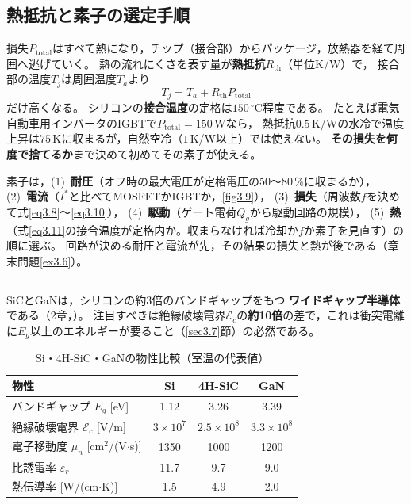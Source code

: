 \subsection{熱抵抗と素子の選定手順}

損失$P_{\mathrm{total}}$はすべて熱になり，チップ（接合部）からパッケージ，放熱器を経て周囲へ逃げていく。
熱の流れにくさを表す量が\textbf{熱抵抗}$R_{\mathrm{th}}$（単位K/W）で，
接合部の温度$T_j$は周囲温度$T_a$より
\begin{equation}
T_j = T_a + R_{\mathrm{th}}P_{\mathrm{total}}
\label{eq3.11}
\end{equation}
だけ高くなる。
シリコンの\textbf{接合温度}の定格は$150\,^{\circ}$C程度である。
たとえば電気自動車用インバータのIGBTで$P_{\mathrm{total}} = 150$\,Wなら，
熱抵抗$0.5$\,K/Wの水冷で温度上昇は$75$\,Kに収まるが，自然空冷（$1$\,K/W以上）では使えない。
\textbf{その損失を何度で捨てるか}まで決めて初めてその素子が使える。

素子は，(1)~\textbf{耐圧}（オフ時の最大電圧が定格電圧の50〜80\,\%に収まるか），
(2)~\textbf{電流}（$I^*$と比べてMOSFETかIGBTか，\ref{fig3.9}），
(3)~\textbf{損失}（周波数$f$を決めて式\ref{eq3.8}〜\ref{eq3.10}），
(4)~\textbf{駆動}（ゲート電荷$Q_g$から駆動回路の規模），
(5)~\textbf{熱}（式\ref{eq3.11}の接合温度が定格内か。収まらなければ冷却か$f$か素子を見直す）の順に選ぶ。
回路が決める耐圧と電流が先，その結果の損失と熱が後である（章末問題\ref{ex3.6}）。

\subsection{}

SiCとGaNは，シリコンの約3倍のバンドギャップをもつ
\textbf{ワイドギャップ半導体}である（2章，）。
注目すべきは絶縁破壊電界$\mathcal{E}_c$の\textbf{約10倍}の差で，これは衝突電離に$E_g$以上のエネルギーが要ること（\ref{sec3.7}節）の必然である。

\begin{table}[ht]
\begin{center}
\caption{Si・4H-SiC・GaNの物性比較（室温の代表値）}
\label{tab3.2}
{\small
\begin{tabular}{l|c|c|c}
\hline
物性 & Si & 4H-SiC & GaN \\
\hline
バンドギャップ $E_g$ [eV] & 1.12 & 3.26 & 3.39 \\
絶縁破壊電界 $\mathcal{E}_c$ [V/m] & $3\times10^7$ & $2.5\times10^8$ & $3.3\times10^8$ \\
電子移動度 $\mu_n$ [cm$^2$/(V$\cdot$s)] & 1350 & 1000 & 1200 \\
比誘電率 $\varepsilon_r$ & 11.7 & 9.7 & 9.0 \\
熱伝導率 [W/(cm$\cdot$K)] & 1.5 & 4.9 & 2.0 \\
\hline
\end{tabular}
}
\end{center}
\end{table}

